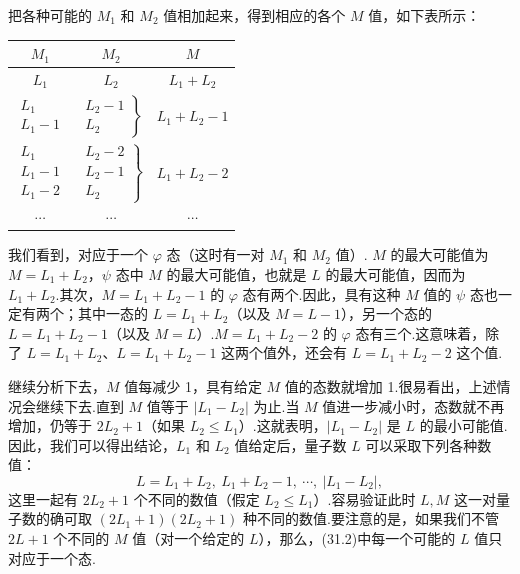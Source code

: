 把各种可能的 $M_1$ 和 $M_2$ 值相加起来，得到相应的各个 $M$ 值，如下表所示：
\begin{center}
\begin{tabular}{ccc}
  $M_1$ & $M_2$ & $M$\\
  \hline
  $L_1$ & $L_2$ & $L_1+L_2$\\[0.3em]
  $\begin{array}{c}L_1\\ L_1-1\end{array}$ &
  $\left.\begin{array}{c}L_2-1\\ L_2\end{array}\right\}$ &
  $L_1+L_2-1$\\[0.3em]
  $\begin{array}{c}L_1\\ L_1-1\\ L_1-2\end{array}$ &
  $\left.\begin{array}{c}L_2-2\\ L_2-1\\ L_2\end{array}\right\}$ &
  $L_1+L_2-2$\\[0.3em]
  $\cdots$ & $\cdots$ & $\cdots$
\end{tabular}
\end{center}
我们看到，对应于一个 $\varphi$ 态（这时有一对 $M_1$ 和 $M_2$ 值）. $M$ 的最大可能值为 $M=L_1+L_2$，$\psi$ 态中 $M$ 的最大可能值，也就是 $L$ 的最大可能值，因而为 $L_1+L_2$.其次，$M=L_1+L_2-1$ 的 $\varphi$ 态有两个.因此，具有这种 $M$ 值的 $\psi$ 态也一定有两个；其中一态的 $L=L_1+L_2$（以及 $M=L-1$），另一个态的 $L=L_1+L_2-1$（以及 $M=L$）.$M=L_1+L_2-2$ 的 $\varphi$ 态有三个.这意味着，除了 $L=L_1+L_2$、$L=L_1+L_2-1$ 这两个值外，还会有 $L=L_1+L_2-2$ 这个值.

继续分析下去，$M$ 值每减少 1，具有给定 $M$ 值的态数就增加 1.很易看出，上述情况会继续下去.直到 $M$ 值等于 $|L_1-L_2|$ 为止.当 $M$ 值进一步减小时，态数就不再增加，仍等于 $2L_2+1$（如果 $L_2\leqslant L_1$）.这就表明，$|L_1-L_2|$ 是 $L$ 的最小可能值.因此，我们可以得出结论，$L_1$ 和 $L_2$ 值给定后，量子数 $L$ 可以采取下列各种数值：
\begin{equation}
  L=L_1+L_2,\ L_1+L_2-1,\ \cdots,\ |L_1-L_2|,
\end{equation}
这里一起有 $2L_2+1$ 个不同的数值（假定 $L_2\leqslant L_1$）.容易验证此时 $L,M$ 这一对量子数的确可取 $(2L_1+1)(2L_2+1)$ 种不同的数值.要注意的是，如果我们不管 $2L+1$ 个不同的 $M$ 值（对一个给定的 $L$），那么，(31.2)中每一个可能的 $L$ 值只对应于一个态.

